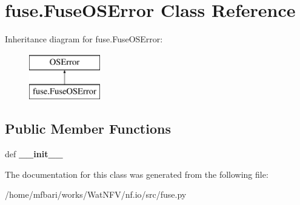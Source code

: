 \hypertarget{classfuse_1_1FuseOSError}{\section{fuse.\-Fuse\-O\-S\-Error Class Reference}
\label{classfuse_1_1FuseOSError}
}
Inheritance diagram for fuse.\-Fuse\-O\-S\-Error\-:\begin{figure}[H]
\begin{center}
\leavevmode
\includegraphics[height=2.000000cm]{classfuse_1_1FuseOSError}
\end{center}
\end{figure}
\subsection*{Public Member Functions}
\begin{DoxyCompactItemize}
\item 
\hypertarget{classfuse_1_1FuseOSError_a1a50e69b2285e04a8103d5c9b8b91343}{def {\bfseries \-\_\-\-\_\-init\-\_\-\-\_\-}}\label{classfuse_1_1FuseOSError_a1a50e69b2285e04a8103d5c9b8b91343}

\end{DoxyCompactItemize}


The documentation for this class was generated from the following file\-:\begin{DoxyCompactItemize}
\item 
/home/mfbari/works/\-Wat\-N\-F\-V/nf.\-io/src/fuse.\-py\end{DoxyCompactItemize}
